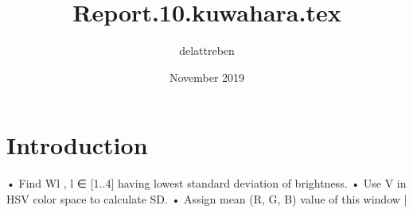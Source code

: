 \documentclass{article}
\title{Report.10.kuwahara.tex}
\author{delattreben }
\date{November 2019}
\begin{document}
\maketitle

\section{Introduction}
• Find Wl
, l ∈ [1..4] having lowest standard deviation of
brightness.
• Use V in HSV color space to calculate SD.
• Assign mean (R, G, B) value of this window |
\end{document}
